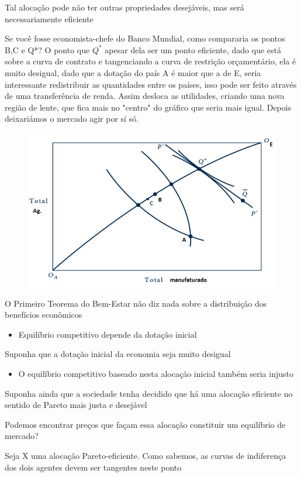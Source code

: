 \documentclass[a4paper,12pt]{article}[abntex2]
\begin{document}
Tal alocação pode não ter outras propriedades desejáveis, mas será necessariamente eficiente

Se você fosse economista-chefe do Banco Mundial, como compararia os pontos B,C e Q*? O ponto que \(Q^*\) apesar dela ser um ponto eficiente, dado que está sobre a curva de contrato e tangenciando a curva de restrição orçamentário, ela é muito desigual, dado que a dotação do país A é maior que a de E, seria interessante redistribuir as quantidades entre os países, isso pode ser feito através de uma transferência de renda. Assim desloca as utilidades, criando uma nova região de lente, que fica mais no "centro" do gráfico que seria mais igual. Depois deixariámos o mercado agir por sí só.   

\begin{figure}[H]
    \centering
    \includegraphics[width=0.70\linewidth]{Imagens/a2i8.png}
\end{figure}

O Primeiro Teorema do Bem-Estar não diz nada sobre a distribuição dos benefícios econômicos\begin{itemize}
    \item Equilíbrio competitivo depende da dotação inicial
\end{itemize}

Suponha que a dotação inicial da economia seja muito desigual\begin{itemize}
    \item O equilíbrio competitivo baseado nesta alocação inicial também seria injusto
\end{itemize}

Suponha ainda que a sociedade tenha decidido que há uma alocação eficiente no sentido de Pareto mais justa e desejável

Podemos encontrar preços que façam essa alocação constituir um equilíbrio de mercado?

Seja X   uma alocação Pareto-eficiente. Como sabemos, as curvas de indiferença dos dois agentes devem ser tangentes neste ponto
\end{document}
